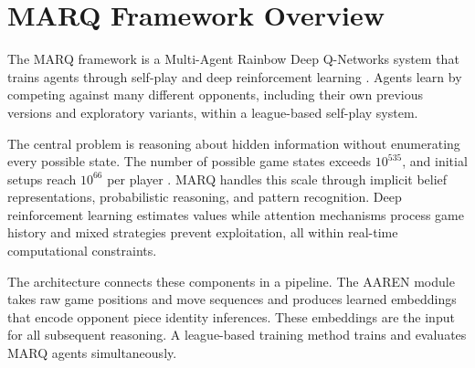 \section{MARQ Framework Overview}

The MARQ framework is a Multi-Agent Rainbow Deep Q-Networks system that trains agents through self-play and deep reinforcement learning \cite{AlphaStratego}. Agents learn by competing against many different opponents, including their own previous versions and exploratory variants, within a league-based self-play system.

The central problem is reasoning about hidden information without enumerating every possible state. The number of possible game states exceeds $10^{535}$, and initial setups reach $10^{66}$ per player \cite{perolat2022stratego}. MARQ handles this scale through implicit belief representations, probabilistic reasoning, and pattern recognition. Deep reinforcement learning estimates values while attention mechanisms process game history and mixed strategies prevent exploitation, all within real-time computational constraints.

The architecture connects these components in a pipeline. The AAREN module takes raw game positions and move sequences and produces learned embeddings that encode opponent piece identity inferences. These embeddings are the input for all subsequent reasoning. A league-based training method trains and evaluates MARQ agents simultaneously.




